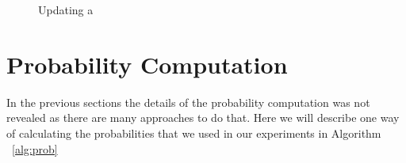 \begin{figure}[ht]
{{}}
\caption{Updating a \PF}
\label{fig:update}
\end{figure}

\section {Probability Computation}
\label{sec:prob}
In the previous sections the details of the probability computation was not revealed as there are many approaches to do that. Here we will describe one way of calculating the probabilities that we used in our experiments in Algorithm ~\ref{alg:prob}

